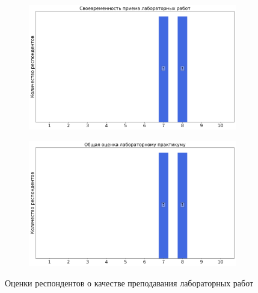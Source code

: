 \begin{figure}[H]
\begin{subfigure}[b]{0.45\textwidth}
				\includegraphics[width=\textwidth]{images/2 course/Общая физика - электричество и магнетизм/labniks-marks-Галишников А.А.-2.png}
			\end{subfigure}
			\begin{subfigure}[b]{0.45\textwidth}
				\centering
				\includegraphics[width=\textwidth]{images/2 course/Общая физика - электричество и магнетизм/labniks-marks-Галишников А.А.-3.png}
			\end{subfigure}	
			\caption{Оценки респондентов о качестве преподавания лабораторных работ}
		\end{figure}


